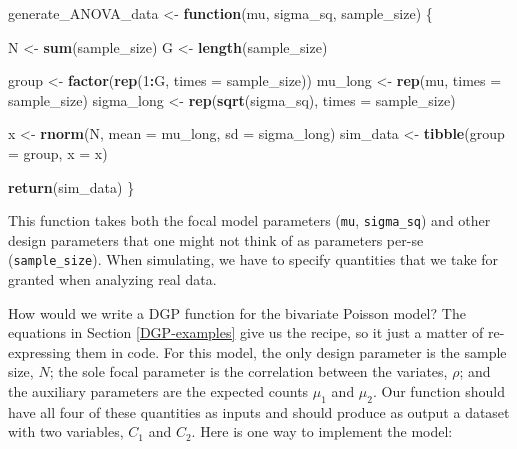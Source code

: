 \documentclass[
]{book}
\newenvironment{Shaded}{\begin{snugshade}}{\end{snugshade}}
\newcommand{\AttributeTok}[1]{\textcolor[rgb]{0.13,0.29,0.53}{#1}}
\newcommand{\ControlFlowTok}[1]{\textcolor[rgb]{0.13,0.29,0.53}{\textbf{#1}}}
\newcommand{\DecValTok}[1]{\textcolor[rgb]{0.00,0.00,0.81}{#1}}
\newcommand{\FunctionTok}[1]{\textcolor[rgb]{0.13,0.29,0.53}{\textbf{#1}}}
\newcommand{\NormalTok}[1]{#1}
\newcommand{\OtherTok}[1]{\textcolor[rgb]{0.56,0.35,0.01}{#1}}
\newcommand{\SpecialCharTok}[1]{\textcolor[rgb]{0.81,0.36,0.00}{\textbf{#1}}}
\begin{document}
\begin{Shaded}
\begin{Highlighting}[]
\NormalTok{generate\_ANOVA\_data }\OtherTok{\textless{}{-}} \ControlFlowTok{function}\NormalTok{(mu, sigma\_sq, sample\_size) \{}
  
\NormalTok{  N }\OtherTok{\textless{}{-}} \FunctionTok{sum}\NormalTok{(sample\_size)}
\NormalTok{  G }\OtherTok{\textless{}{-}} \FunctionTok{length}\NormalTok{(sample\_size)}
  
\NormalTok{  group }\OtherTok{\textless{}{-}} \FunctionTok{factor}\NormalTok{(}\FunctionTok{rep}\NormalTok{(}\DecValTok{1}\SpecialCharTok{:}\NormalTok{G, }\AttributeTok{times =}\NormalTok{ sample\_size))}
\NormalTok{  mu\_long }\OtherTok{\textless{}{-}} \FunctionTok{rep}\NormalTok{(mu, }\AttributeTok{times =}\NormalTok{ sample\_size)}
\NormalTok{  sigma\_long }\OtherTok{\textless{}{-}} \FunctionTok{rep}\NormalTok{(}\FunctionTok{sqrt}\NormalTok{(sigma\_sq), }\AttributeTok{times =}\NormalTok{ sample\_size)}
  
\NormalTok{  x }\OtherTok{\textless{}{-}} \FunctionTok{rnorm}\NormalTok{(N, }\AttributeTok{mean =}\NormalTok{ mu\_long, }\AttributeTok{sd =}\NormalTok{ sigma\_long)}
\NormalTok{  sim\_data }\OtherTok{\textless{}{-}} \FunctionTok{tibble}\NormalTok{(}\AttributeTok{group =}\NormalTok{ group, }\AttributeTok{x =}\NormalTok{ x)}
  
  \FunctionTok{return}\NormalTok{(sim\_data)}
\NormalTok{\}}
\end{Highlighting}
\end{Shaded}

This function takes both the focal model parameters (\texttt{mu}, \texttt{sigma\_sq}) and other design parameters that one might not think of as parameters per-se (\texttt{sample\_size}).
When simulating, we have to specify quantities that we take for granted when analyzing real data.

How would we write a DGP function for the bivariate Poisson model? The equations in Section \ref{DGP-examples} give us the recipe, so it just a matter of re-expressing them in code.
For this model, the only design parameter is the sample size, \(N\);
the sole focal parameter is the correlation between the variates, \(\rho\); and
the auxiliary parameters are the expected counts \(\mu_1\) and \(\mu_2\).
Our function should have all four of these quantities as inputs and should produce as output a dataset with two variables, \(C_1\) and \(C_2\).
Here is one way to implement the model:
\end{document}
